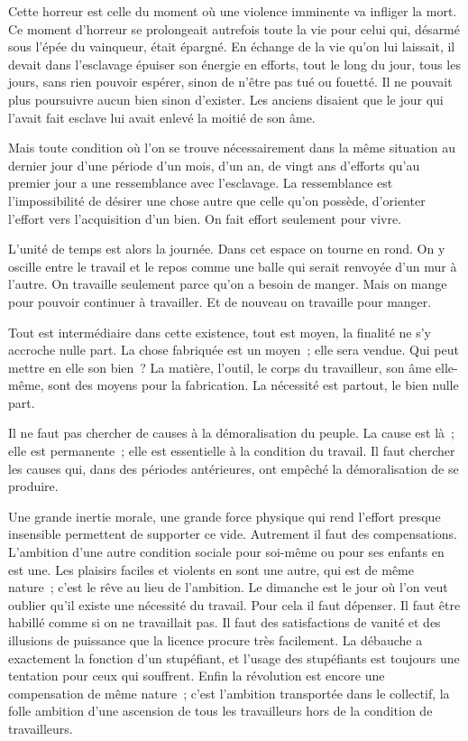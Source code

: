 \documentclass[french,twoside]{book} %
\begin{document}
Cette horreur est celle du moment où une violence imminente va infliger la mort. Ce moment d'horreur se prolongeait autrefois toute la vie pour celui qui, désarmé sous l'épée du vainqueur, était épargné. En échange de la vie qu'on lui laissait, il devait dans l'esclavage épuiser son énergie en efforts, tout le long du jour, tous les jours, sans rien pouvoir espérer, sinon de n'être pas tué ou fouetté. Il ne pouvait plus poursuivre aucun bien sinon d'exister. Les anciens disaient que le jour qui l'avait fait esclave lui avait enlevé la moitié de son âme.\par
Mais toute condition où l'on se trouve nécessairement dans la même situation au dernier jour d'une période d'un mois, d'un an, de vingt ans d'efforts qu'au premier jour a une ressemblance avec l'esclavage. La ressemblance est l'impossibilité de désirer une chose autre que celle qu'on possède, d'orienter l'effort vers l'acquisition d'un bien. On fait effort seulement pour vivre.\par
L'unité de temps est alors la journée. Dans cet espace on tourne en rond. On y oscille entre le travail et le repos comme une balle qui serait renvoyée d'un mur à l'autre. On travaille seulement parce qu'on a besoin de manger. Mais on mange pour pouvoir continuer à travailler. Et de nouveau on travaille pour manger.\par
Tout est intermédiaire dans cette existence, tout est moyen, la finalité ne s'y accroche nulle part. La chose fabriquée est un moyen ; elle sera vendue. Qui peut mettre en elle son bien ? La matière, l'outil, le corps du travailleur, son âme elle-même, sont des moyens pour la fabrication. La nécessité est partout, le bien nulle part.\par
Il ne faut pas chercher de causes à la démoralisation du peuple. La cause est là ; elle est permanente ; elle est essentielle à la condition du travail. Il faut chercher les causes qui, dans des périodes antérieures, ont empêché la démoralisation de se produire.\par
Une grande inertie morale, une grande force physique qui rend l'effort presque insensible permettent de supporter ce vide. Autrement il faut des compensations. L'ambition d'une autre condition sociale pour soi-même ou pour ses enfants en est une. Les plaisirs faciles et violents en sont une autre, qui est de même nature ; c'est le rêve au lieu de l'ambition. Le dimanche est le jour où l'on veut oublier qu'il existe une nécessité du travail. Pour cela il faut dépenser. Il faut être habillé comme si on ne travaillait pas. Il faut des satisfactions de vanité et des illusions de puissance que la licence procure très facilement. La débauche a exactement la fonction d'un stupéfiant, et l'usage des stupéfiants est toujours une tentation pour ceux qui souffrent. Enfin la révolution est encore une compensation de même nature ; c'est l'ambition transportée dans le collectif, la folle ambition d'une ascension de tous les travailleurs hors de la condition de travailleurs.\par
\end{document}
